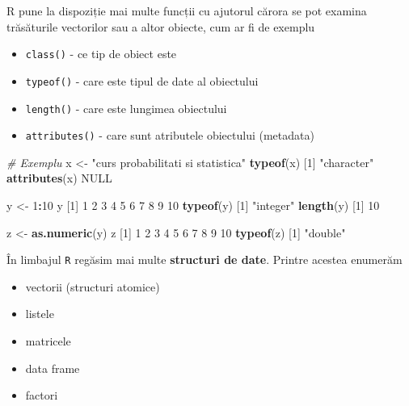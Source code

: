 \documentclass[]{article}
\newenvironment{Shaded}{\begin{snugshade}}{\end{snugshade}}
\newcommand{\CommentTok}[1]{\textcolor[rgb]{0.56,0.35,0.01}{\textit{#1}}}
\newcommand{\DecValTok}[1]{\textcolor[rgb]{0.00,0.00,0.81}{#1}}
\newcommand{\KeywordTok}[1]{\textcolor[rgb]{0.13,0.29,0.53}{\textbf{#1}}}
\newcommand{\NormalTok}[1]{#1}
\newcommand{\OperatorTok}[1]{\textcolor[rgb]{0.81,0.36,0.00}{\textbf{#1}}}
\newcommand{\OtherTok}[1]{\textcolor[rgb]{0.56,0.35,0.01}{#1}}
\newcommand{\StringTok}[1]{\textcolor[rgb]{0.31,0.60,0.02}{#1}}
\providecommand{\tightlist}{%
  \setlength{\itemsep}{0pt}\setlength{\parskip}{0pt}}
\begin{document}
R pune la dispoziție mai multe funcții cu ajutorul cărora se pot examina
trăsăturile vectorilor sau a altor obiecte, cum ar fi de exemplu

\begin{itemize}
\tightlist
\item
  \texttt{class()} - ce tip de obiect este
\item
  \texttt{typeof()} - care este tipul de date al obiectului
\item
  \texttt{length()} - care este lungimea obiectului
\item
  \texttt{attributes()} - care sunt atributele obiectului (metadata)
\end{itemize}

\begin{Shaded}
\begin{Highlighting}[]
\CommentTok{# Exemplu}
\NormalTok{x <-}\StringTok{ "curs probabilitati si statistica"}
\KeywordTok{typeof}\NormalTok{(x)}
\NormalTok{[}\DecValTok{1}\NormalTok{] }\StringTok{"character"}
\KeywordTok{attributes}\NormalTok{(x)}
\OtherTok{NULL}

\NormalTok{y <-}\StringTok{ }\DecValTok{1}\OperatorTok{:}\DecValTok{10}
\NormalTok{y}
\NormalTok{ [}\DecValTok{1}\NormalTok{]  }\DecValTok{1}  \DecValTok{2}  \DecValTok{3}  \DecValTok{4}  \DecValTok{5}  \DecValTok{6}  \DecValTok{7}  \DecValTok{8}  \DecValTok{9} \DecValTok{10}
\KeywordTok{typeof}\NormalTok{(y)}
\NormalTok{[}\DecValTok{1}\NormalTok{] }\StringTok{"integer"}
\KeywordTok{length}\NormalTok{(y)}
\NormalTok{[}\DecValTok{1}\NormalTok{] }\DecValTok{10}

\NormalTok{z <-}\StringTok{ }\KeywordTok{as.numeric}\NormalTok{(y)}
\NormalTok{z}
\NormalTok{ [}\DecValTok{1}\NormalTok{]  }\DecValTok{1}  \DecValTok{2}  \DecValTok{3}  \DecValTok{4}  \DecValTok{5}  \DecValTok{6}  \DecValTok{7}  \DecValTok{8}  \DecValTok{9} \DecValTok{10}
\KeywordTok{typeof}\NormalTok{(z)}
\NormalTok{[}\DecValTok{1}\NormalTok{] }\StringTok{"double"}
\end{Highlighting}
\end{Shaded}

În limbajul \texttt{R} regăsim mai multe \textbf{structuri de date}.
Printre acestea enumerăm

\begin{itemize}
\tightlist
\item
  vectorii (structuri atomice)
\item
  listele
\item
  matricele
\item
  data frame
\item
  factori
\end{itemize}
\end{document}
